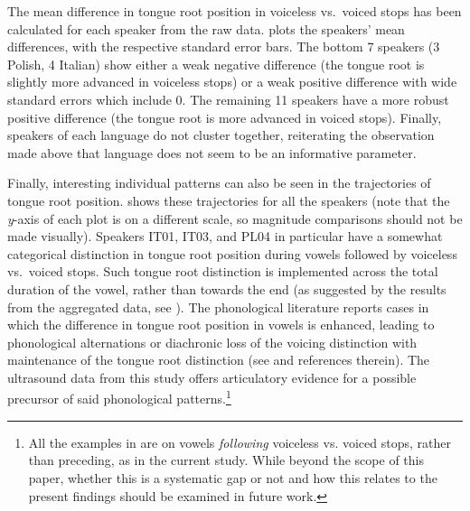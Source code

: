 \documentclass[
  12pt,
]{article}
\begin{document}
The mean difference in tongue root position in voiceless vs.~voiced
stops has been calculated for each speaker from the raw data.
 plots the speakers' mean differences, with the
respective standard error bars. The bottom 7 speakers (3 Polish, 4
Italian) show either a weak negative difference (the tongue root is
slightly more advanced in voiceless stops) or a weak positive difference
with wide standard errors which include 0. The remaining 11 speakers
have a more robust positive difference (the tongue root is more advanced
in voiced stops). Finally, speakers of each language do not cluster
together, reiterating the observation made above that language does not
seem to be an informative parameter.

Finally, interesting individual patterns can also be seen in the
trajectories of tongue root position.  shows
these trajectories for all the speakers (note that the \emph{y}-axis of
each plot is on a different scale, so magnitude comparisons should not
be made visually). Speakers IT01, IT03, and PL04 in particular have a
somewhat categorical distinction in tongue root position during vowels
followed by voiceless vs.~voiced stops. Such tongue root distinction is
implemented across the total duration of the vowel, rather than towards
the end (as suggested by the results from the aggregated data, see
). The phonological literature reports cases in which the
difference in tongue root position in vowels is enhanced, leading to
phonological alternations or diachronic loss of the voicing distinction
with maintenance of the tongue root distinction (see \citealt{vaux1996}
and references therein). The ultrasound data from this study offers
articulatory evidence for a possible precursor of said phonological
patterns.\footnote{All the examples in \citet{vaux1996} are on vowels \textit{following} voiceless vs. voiced stops, rather than preceding, as in the current study. While beyond the scope of this paper, whether this is a systematic gap or not and how this relates to the present findings should be examined in future work.}
\end{document}
